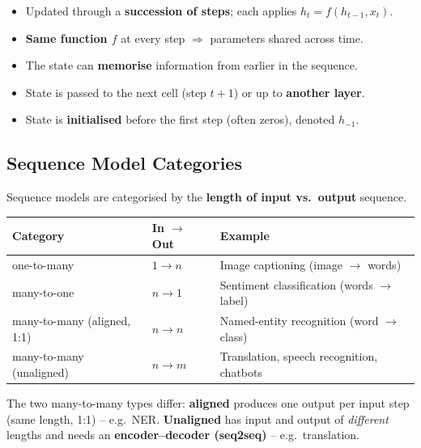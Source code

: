 \documentclass[10pt,a4paper]{article}
\begin{document}
	\begin{itemize}[leftmargin=*]
		\item Updated through a \textbf{succession of steps}; each applies $h_t = f(h_{t-1}, x_t)$.
		\item \textbf{Same function $f$} at every step $\Rightarrow$ parameters shared across time.
		\item The state can \textbf{memorise} information from earlier in the sequence.
		\item State is passed to the next cell (step $t{+}1$) or up to \textbf{another layer}.
		\item State is \textbf{initialised} before the first step (often zeros), denoted $h_{-1}$.
	\end{itemize}

	\subsection{Sequence Model Categories}

	\begin{definitionbox}
		Sequence models are categorised by the \textbf{length of input vs.\ output} sequence.
	\end{definitionbox}

	\begin{center}
		\begin{tabular}{lll}
			\toprule
			Category & In $\to$ Out & Example \\
			\midrule
			one-to-many & $1 \to n$ & Image captioning (image $\to$ words) \\
			many-to-one & $n \to 1$ & Sentiment classification (words $\to$ label) \\
			many-to-many (aligned, 1:1) & $n \to n$ & Named-entity recognition (word $\to$ class) \\
			many-to-many (unaligned) & $n \to m$ & Translation, speech recognition, chatbots \\
			\bottomrule
		\end{tabular}
	\end{center}

	\begin{importantbox}
		The two many-to-many types differ: \textbf{aligned} produces one output per input step (same length, 1:1) -- e.g.\ NER. \textbf{Unaligned} has input and output of \emph{different} lengths and needs an \textbf{encoder--decoder (seq2seq)} -- e.g.\ translation.
	\end{importantbox}
\end{document}
